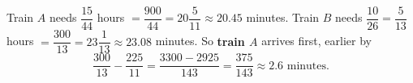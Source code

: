 Train $A$ needs $\dfrac{15}{44}$ hours $=\dfrac{900}{44}=20\dfrac{5}{11}\approx20.45$ minutes. Train $B$ needs $\dfrac{10}{26}=\dfrac{5}{13}$ hours $=\dfrac{300}{13}=23\dfrac{1}{13}\approx23.08$ minutes. So \textbf{train $A$} arrives first, earlier by
\[\dfrac{300}{13}-\dfrac{225}{11}=\dfrac{3300-2925}{143}=\boxed{\dfrac{375}{143}\approx2.6\text{ minutes}}.\]
